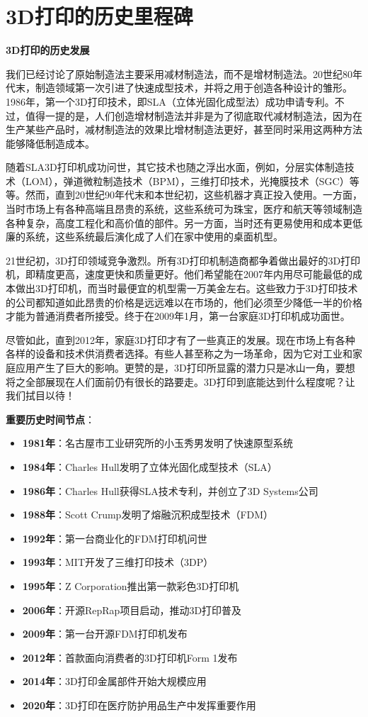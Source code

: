 \documentclass[12pt,UTF8]{ctexbook}
\begin{document}
\section{3D打印的历史里程碑}

\textbf{3D打印的历史发展}

我们已经讨论了原始制造法主要采用减材制造法，而不是增材制造法。20世纪80年代末，制造领域第一次引进了快速成型技术，并将之用于创造各种设计的雏形。1986年，第一个3D打印技术，即SLA（立体光固化成型法）成功申请专利。不过，值得一提的是，人们创造增材制造法并非是为了彻底取代减材制造法，因为在生产某些产品时，减材制造法的效果比增材制造法更好，甚至同时采用这两种方法能够降低制造成本。

随着SLA3D打印机成功问世，其它技术也随之浮出水面，例如，分层实体制造技术（LOM），弹道微粒制造技术（BPM），三维打印技术，光掩膜技术（SGC）等等。然而，直到20世纪90年代末和本世纪初，这些机器才真正投入使用。一方面，当时市场上有各种高端且昂贵的系统，这些系统可为珠宝，医疗和航天等领域制造各种复杂，高度工程化和高价值的部件。另一方面，当时还有更易使用和成本更低廉的系统，这些系统最后演化成了人们在家中使用的桌面机型。

21世纪初，3D打印领域竞争激烈。所有3D打印机制造商都争着做出最好的3D打印机，即精度更高，速度更快和质量更好。他们希望能在2007年内用尽可能最低的成本做出3D打印机，而当时最便宜的机型需一万美金左右。这些致力于3D打印技术的公司都知道如此昂贵的价格是远远难以在市场的，他们必须至少降低一半的价格才能为普通消费者所接受。终于在2009年1月，第一台家庭3D打印机成功面世。

尽管如此，直到2012年，家庭3D打印才有了一些真正的发展。现在市场上有各种各样的设备和技术供消费者选择。有些人甚至称之为一场革命，因为它对工业和家庭应用产生了巨大的影响。更赞的是，3D打印所显露的潜力只是冰山一角，要想将之全部展现在人们面前仍有很长的路要走。3D打印到底能达到什么程度呢？让我们拭目以待！

\textbf{重要历史时间节点}：
\begin{itemize}
\item \textbf{1981年}：名古屋市工业研究所的小玉秀男发明了快速原型系统
\item \textbf{1984年}：Charles Hull发明了立体光固化成型技术（SLA）
\item \textbf{1986年}：Charles Hull获得SLA技术专利，并创立了3D Systems公司
\item \textbf{1988年}：Scott Crump发明了熔融沉积成型技术（FDM）
\item \textbf{1992年}：第一台商业化的FDM打印机问世
\item \textbf{1993年}：MIT开发了三维打印技术（3DP）
\item \textbf{1995年}：Z Corporation推出第一款彩色3D打印机
\item \textbf{2006年}：开源RepRap项目启动，推动3D打印普及
\item \textbf{2009年}：第一台开源FDM打印机发布
\item \textbf{2012年}：首款面向消费者的3D打印机Form 1发布
\item \textbf{2014年}：3D打印金属部件开始大规模应用
\item \textbf{2020年}：3D打印在医疗防护用品生产中发挥重要作用
\end{itemize}
\end{document}
